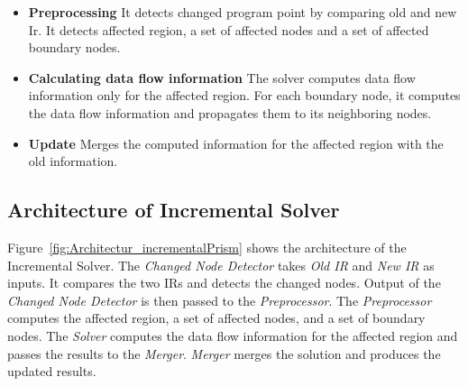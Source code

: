 \documentclass[11pt,a4paper,openright]{report}
\begin{document}
\begin{itemize}
\item \textbf{Preprocessing} It detects changed program point by comparing old and new Ir. It detects affected region,  a set of affected nodes and a set
of affected boundary nodes.

\item \textbf{Calculating data flow information}
The solver computes data flow information only for the affected region. For each boundary node, it computes the data flow information and propagates
them to its neighboring nodes.

\item \textbf{Update} Merges the computed information for the affected region with the old information.

\end{itemize}


\subsection{Architecture of Incremental Solver}
Figure~\ref{fig:Architectur_incrementalPrism} shows the architecture of the Incremental Solver. The \textit{Changed Node Detector}
takes \textit{Old IR} and \textit{New IR} as inputs. It compares the two IRs and detects the changed nodes. 
Output of the \textit{Changed Node Detector} is then passed to the \textit{Preprocessor}. The \textit{Preprocessor} computes 
the affected region, a set of affected nodes, and a set of boundary nodes. The \textit{Solver} computes the data flow information
for the affected region and passes the results to the \textit{Merger}. \textit{Merger} merges the solution and produces the updated results. 
\end{document}
